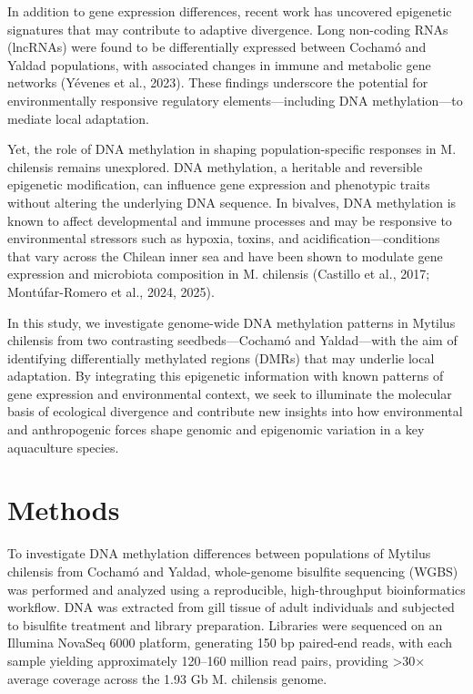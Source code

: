 \documentclass[
]{agujournal2019}
\begin{document}
In addition to gene expression differences, recent work has uncovered
epigenetic signatures that may contribute to adaptive divergence. Long
non-coding RNAs (lncRNAs) were found to be differentially expressed
between Cochamó and Yaldad populations, with associated changes in
immune and metabolic gene networks (Yévenes et al., 2023). These
findings underscore the potential for environmentally responsive
regulatory elements---including DNA methylation---to mediate local
adaptation.

Yet, the role of DNA methylation in shaping population-specific
responses in M. chilensis remains unexplored. DNA methylation, a
heritable and reversible epigenetic modification, can influence gene
expression and phenotypic traits without altering the underlying DNA
sequence. In bivalves, DNA methylation is known to affect developmental
and immune processes and may be responsive to environmental stressors
such as hypoxia, toxins, and acidification---conditions that vary across
the Chilean inner sea and have been shown to modulate gene expression
and microbiota composition in M. chilensis (Castillo et al., 2017;
Montúfar-Romero et al., 2024, 2025).

In this study, we investigate genome-wide DNA methylation patterns in
Mytilus chilensis from two contrasting seedbeds---Cochamó and
Yaldad---with the aim of identifying differentially methylated regions
(DMRs) that may underlie local adaptation. By integrating this
epigenetic information with known patterns of gene expression and
environmental context, we seek to illuminate the molecular basis of
ecological divergence and contribute new insights into how environmental
and anthropogenic forces shape genomic and epigenomic variation in a key
aquaculture species.

\section{Methods}\label{methods}

To investigate DNA methylation differences between populations of
Mytilus chilensis from Cochamó and Yaldad, whole-genome bisulfite
sequencing (WGBS) was performed and analyzed using a reproducible,
high-throughput bioinformatics workflow. DNA was extracted from gill
tissue of adult individuals and subjected to bisulfite treatment and
library preparation. Libraries were sequenced on an Illumina NovaSeq
6000 platform, generating 150 bp paired-end reads, with each sample
yielding approximately 120--160 million read pairs, providing
\textgreater30× average coverage across the 1.93 Gb M. chilensis genome.
\end{document}
